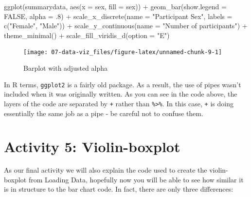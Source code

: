 \documentclass[
  oneside]{book}
\newenvironment{Shaded}{\begin{snugshade}}{\end{snugshade}}
\newcommand{\AttributeTok}[1]{\textcolor[rgb]{0.77,0.63,0.00}{#1}}
\newcommand{\ConstantTok}[1]{\textcolor[rgb]{0.00,0.00,0.00}{#1}}
\newcommand{\DecValTok}[1]{\textcolor[rgb]{0.00,0.00,0.81}{#1}}
\newcommand{\FunctionTok}[1]{\textcolor[rgb]{0.00,0.00,0.00}{#1}}
\newcommand{\NormalTok}[1]{#1}
\newcommand{\SpecialCharTok}[1]{\textcolor[rgb]{0.00,0.00,0.00}{#1}}
\newcommand{\StringTok}[1]{\textcolor[rgb]{0.31,0.60,0.02}{#1}}
\begin{document}
\begin{Shaded}
\begin{Highlighting}[]
\FunctionTok{ggplot}\NormalTok{(summarydata, }\FunctionTok{aes}\NormalTok{(}\AttributeTok{x =}\NormalTok{ sex, }\AttributeTok{fill =}\NormalTok{ sex)) }\SpecialCharTok{+}
  \FunctionTok{geom\_bar}\NormalTok{(}\AttributeTok{show.legend =} \ConstantTok{FALSE}\NormalTok{, }\AttributeTok{alpha =}\NormalTok{ .}\DecValTok{8}\NormalTok{) }\SpecialCharTok{+}
  \FunctionTok{scale\_x\_discrete}\NormalTok{(}\AttributeTok{name =} \StringTok{"Participant Sex"}\NormalTok{, }
                   \AttributeTok{labels =} \FunctionTok{c}\NormalTok{(}\StringTok{"Female"}\NormalTok{, }\StringTok{"Male"}\NormalTok{)) }\SpecialCharTok{+}
  \FunctionTok{scale\_y\_continuous}\NormalTok{(}\AttributeTok{name =} \StringTok{"Number of participants"}\NormalTok{) }\SpecialCharTok{+}
  \FunctionTok{theme\_minimal}\NormalTok{() }\SpecialCharTok{+}
  \FunctionTok{scale\_fill\_viridis\_d}\NormalTok{(}\AttributeTok{option =} \StringTok{"E"}\NormalTok{)}
\end{Highlighting}
\end{Shaded}

\begin{figure}

{\centering \texttt{[image: 07-data-viz\_files/figure-latex/unnamed-chunk-9-1]} 

}

\caption{Barplot with adjusted alpha}\label{fig:unnamed-chunk-9}
\end{figure}

\begin{warning}
In R terms, \texttt{ggplot2} is a fairly old package. As a result, the
use of pipes wasn't included when it was originally written. As you can
see in the code above, the layers of the code are separated by
\texttt{+} rather than \texttt{\%\textgreater{}\%}. In this case,
\texttt{+} is doing essentially the same job as a pipe - be careful not
to confuse them.
\end{warning}

\hypertarget{activity-5-violin-boxplot}{%
\section{Activity 5: Violin-boxplot}\label{activity-5-violin-boxplot}}

As our final activity we will also explain the code used to create the violin-boxplot from Loading Data, hopefully now you will be able to see how similar it is in structure to the bar chart code. In fact, there are only three differences:
\end{document}

